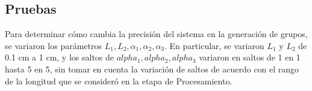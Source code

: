 \subsection{Pruebas}

Para determinar cómo cambia la precisión del sistema en la generación de grupos, se variaron los parámetros $L_1, L_2, \alpha_1, \alpha_2, \alpha_3$. En particular, se variaron $L_1$ y $L_2$ de 0.1 cm a 1 cm, y los saltos de $alpha_1, alpha_2, alpha_3$ variaron en saltos de 1 en 1 hasta 5 en 5, sin tomar en cuenta la variación de saltos de acuerdo con el rango de la longitud que se consideró en la etapa de Procesamiento.